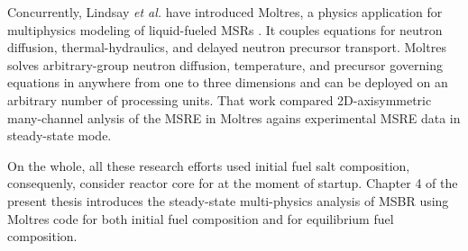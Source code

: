 Concurrently, Lindsay \emph{et al.} have introduced Moltres, a physics application for multiphysics modeling of liquid-fueled \glspl{MSR} \cite{lindsay_introduction_2018}. It couples equations for neutron diffusion, thermal-hydraulics, and delayed neutron precursor transport. Moltres solves arbitrary-group neutron diffusion, temperature, and precursor governing equations in anywhere from one to three dimensions and can be deployed on an arbitrary number of processing units. That work compared 2D-axisymmetric many-channel anlysis of the \gls{MSRE} in Moltres agains experimental \gls{MSRE} data in steady-state mode.

On the whole, all these research efforts used initial fuel salt composition, consequenly, consider reactor core for at the moment of startup. Chapter 4 of the present thesis introduces the steady-state multi-physics analysis of \gls{MSBR} using Moltres code for both initial fuel composition and for equilibrium fuel composition.

